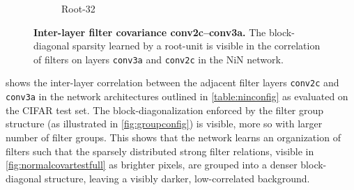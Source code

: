 \documentclass[thesis]{subfiles}
\begin{document}
\begin{figure}[p]
\begin{subfigure}[b]{0.3\textheight}
				\caption{Root-32}\label{fig:root32corrfull}
			\end{subfigure}
			\caption[Inter-layer filter covariance conv2c--conv3a.]{\textbf{Inter-layer filter covariance conv2c--conv3a.} The block-diagonal sparsity learned by a root-unit is visible in the correlation of filters on layers \texttt{conv3a} and \texttt{conv2c} in the NiN network.}\label{fig:covar}
		\end{figure}
	
	 shows the inter-layer correlation between the adjacent filter layers \texttt{conv2c} and \texttt{conv3a} in the network architectures outlined in \cref{table:ninconfig} as evaluated on the CIFAR test set. The block-diagonalization enforced by the filter group structure (as illustrated in \cref{fig:groupconfig}) is visible, more so with larger number of filter groups. This shows that the network learns an organization of filters such that the sparsely distributed strong filter relations, visible in \cref{fig:normalcovartestfull} as brighter pixels, are grouped into a denser block-diagonal structure, leaving a visibly darker, low-correlated background.
	
\end{document}
